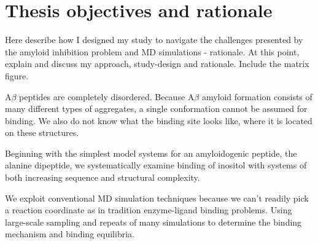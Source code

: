 \section{Thesis objectives and rationale}
\begin{outline}
	\1 Here describe how I designed my study to navigate the challenges presented by the amyloid inhibition problem and MD simulations - rationale. At this point, explain and discuss my approach, study-design and rationale. Include the matrix figure.


	\1 A$\beta$ peptides are completely disordered.  Because A$\beta$ amyloid formation consists of many different types of aggregates, a single conformation cannot be assumed for binding.  We also do not know what the binding site looks like, where it is located on these structures.

	\1 Beginning with the simplest model systems for an amyloidogenic peptide, the alanine dipeptide, we systematically examine binding of inositol with systems of both increasing sequence and structural complexity.

	\1 We exploit conventional MD simulation techniques because we can't readily pick a reaction coordinate as in tradition enzyme-ligand binding problems. Using large-scale sampling and repeats of many simulations to determine the binding mechanism and binding equilibria.	
\end{outline}

